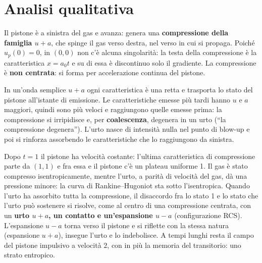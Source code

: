 \documentclass[11pt,a4paper]{article}
\newcommand{\uma}{u-a}
\newcommand{\upa}{u+a}
\begin{document}
\section{Analisi qualitativa}
Il pistone è a sinistra del gas e avanza: genera una \textbf{compressione della famiglia $\upa$}, che spinge il gas
verso destra, nel verso in cui si propaga. Poiché $u_p(0)=0$, in $(0,0)$ non c'è alcuna singolarità: la testa
della compressione è la caratteristica $x=a_0t$ e su di essa è discontinuo solo il gradiente. La compressione è
\textbf{non centrata}: si forma per accelerazione continua del pistone.

In un'onda semplice $\upa$ ogni caratteristica è una retta e trasporta lo stato del pistone all'istante di
emissione. Le caratteristiche emesse più tardi hanno $u$ e $a$ maggiori, quindi sono più veloci e raggiungono
quelle emesse prima: la compressione si irripidisce e, per \textbf{coalescenza}, degenera in un urto
(``la compressione degenera''). L'urto nasce di intensità nulla nel punto di blow-up e poi si rinforza assorbendo
le caratteristiche che lo raggiungono da sinistra.

Dopo $t=1$ il pistone ha velocità costante: l'ultima caratteristica di compressione parte da $(1,1)$ e fra essa e
il pistone c'è un plateau uniforme 1. Il gas è stato compresso isentropicamente, mentre l'urto, a parità di
velocità del gas, dà una pressione minore: la curva di Rankine--Hugoniot sta sotto l'isentropica. Quando l'urto
ha assorbito tutta la compressione, il disaccordo fra lo stato 1 e lo stato che l'urto può sostenere si risolve,
come al centro di una compressione centrata, con un \textbf{urto $\upa$, un contatto e un'espansione $\uma$}
(configurazione RCS). L'espansione $\uma$ torna verso il pistone e si riflette con la stessa natura (espansione
$\upa$), insegue l'urto e lo indebolisce. A tempi lunghi resta il campo del pistone impulsivo a velocità $2$, con in
più la memoria del transitorio: uno strato entropico.

\end{document}
